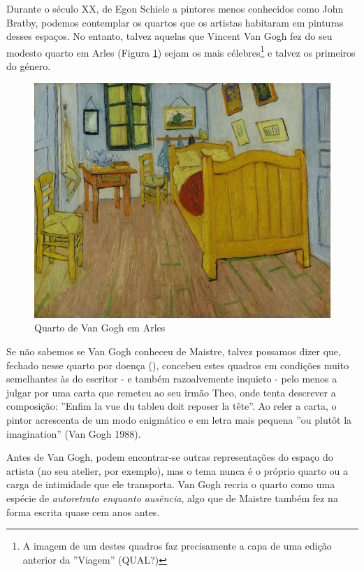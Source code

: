 \documentclass[12pt]{article}
\begin{document}
Durante o século XX, de Egon Schiele a pintores menos conhecidos como
John Bratby, podemos contemplar os quartos que os artistas habitaram
em pinturas desses espaços. No entanto, talvez aquelas que Vincent Van
Gogh fez do seu modesto quarto em Arles (Figura \ref{fig:1}) sejam os
mais célebres\footnote{A imagem de um destes quadros faz precisamente
  a capa de uma edição anterior da ''Viagem'' (QUAL?)} e talvez os
primeiros do género. 

\begin{figure}
  \label{fig:1}
  \centering\includegraphics[height=0.4\textheight,keepaspectratio] {slaapkamer.jpg}
  \caption{Quarto de Van Gogh em Arles}
\end{figure}

Se não sabemos se Van Gogh conheceu de Maistre, talvez possamos dizer
que, fechado nesse quarto por doença (\cite{goghroom}), concebeu estes
quadros em condições muito semelhantes às do escritor - e também
razoalvemente inquieto - pelo menos a julgar por uma carta que remeteu
ao seu irmão Theo, onde tenta descrever a composição: ''Enfim la vue
du tableu doit reposer la tête''. Ao reler a carta, o pintor
acrescenta de um modo enigmático e em letra mais pequena ''ou plutôt
la imagination'' (Van Gogh 1988).

Antes de Van Gogh, podem encontrar-se outras representações do espaço
do artista (no seu atelier, por exemplo), mas o tema nunca é o próprio
quarto ou a carga de intimidade que ele transporta. Van Gogh recria o
quarto como uma espécie de \emph{autoretrato enquanto ausência}, algo
que de Maistre também fez na forma escrita quase cem anos antes.
\end{document}
